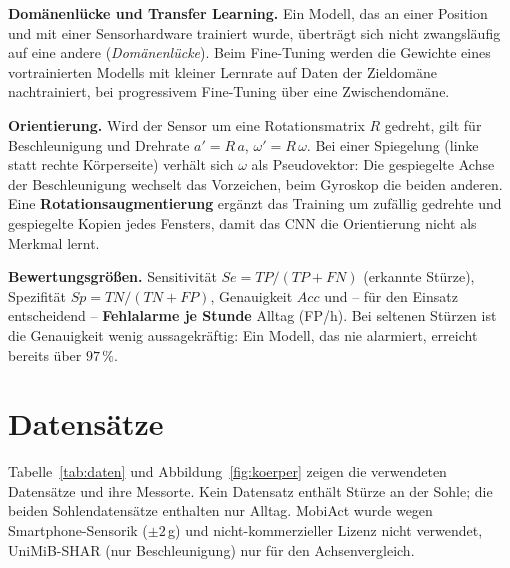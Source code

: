 \documentclass[11pt,a4paper,oneside,parskip=half,open=any,
               numbers=noenddot,listof=totoc,bibliography=totoc]{scrreprt}
\begin{document}
\textbf{Domänenlücke und Transfer Learning.} Ein Modell, das an einer
Position und mit einer Sensorhardware trainiert wurde, überträgt sich
nicht zwangsläufig auf eine andere (\emph{Domänenlücke}). Beim
Fine-Tuning werden die Gewichte eines vortrainierten Modells mit
kleiner Lernrate auf Daten der Zieldomäne nachtrainiert, bei
progressivem Fine-Tuning über eine Zwischendomäne.

\textbf{Orientierung.} Wird der Sensor um eine Rotationsmatrix $R$
gedreht, gilt für Beschleunigung und Drehrate $a' = R\,a$,
$\omega' = R\,\omega$. Bei einer Spiegelung (linke statt rechte Körperseite)
verhält sich $\omega$ als Pseudovektor: Die gespiegelte Achse der
Beschleunigung wechselt das Vorzeichen, beim Gyroskop die beiden anderen.
Eine \textbf{Rotationsaugmentierung} ergänzt das Training um zufällig
gedrehte und gespiegelte Kopien jedes Fensters, damit das CNN die
Orientierung nicht als Merkmal lernt.

\textbf{Bewertungsgrößen.} Sensitivität $Se = TP/(TP+FN)$ (erkannte
Stürze), Spezifität $Sp = TN/(TN+FP)$, Genauigkeit $Acc$ und -- für den
Einsatz entscheidend -- \textbf{Fehlalarme je Stunde} Alltag (FP/h).
Bei seltenen Stürzen ist die Genauigkeit wenig aussagekräftig: Ein
Modell, das nie alarmiert, erreicht bereits über $97\,\%$.

\section{Datensätze}
Tabelle~\ref{tab:daten} und Abbildung~\ref{fig:koerper} zeigen die
verwendeten Datensätze und ihre Messorte. Kein Datensatz enthält
Stürze an der Sohle; die beiden Sohlendatensätze enthalten nur Alltag.
MobiAct wurde wegen Smartphone-Sensorik ($\pm 2$\,g) und
nicht-kommerzieller Lizenz nicht verwendet, UniMiB-SHAR
(nur Beschleunigung) nur für den Achsenvergleich.
\end{document}
